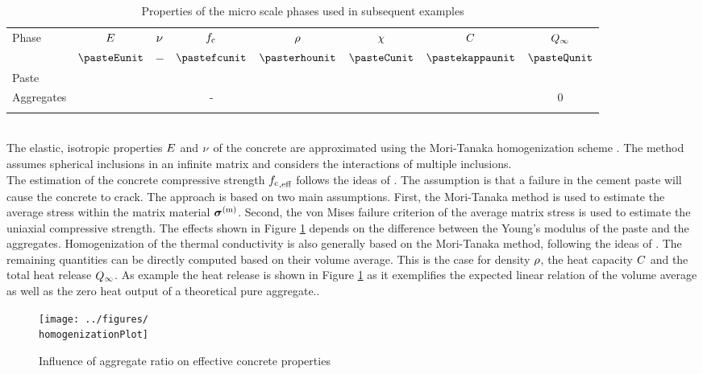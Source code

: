 \begin{table}[ht]
	\begin{center}
		\begin{minipage}{.9\textwidth}
			\caption{Properties of the micro scale phases used in subsequent examples}\label{tab:homogenizationproperties}
			\begin{tabular}{lccccccc}
				\toprule
				Phase & $E$ & $\nu$ & $f_{\text{c}}$ & $\rho$ & $\chi$ & $C$ & $Q_{\infty}$\\
				  & $\pasteEunit$  & $-$  & $\pastefcunit$  & $\pasterhounit$  & $\pasteCunit$  & $\pastekappaunit$  &  $\pasteQunit$ \\
				\midrule
			Paste	& \pasteE & \pastenu & \pastefc & \pasterho & \pasteC & \pastekappa &  \pasteQ \\
			Aggregates	& \aggregatesE & \aggregatesnu & - & \aggregatesrho & \aggregatesC & \aggregateskappa &  0 \\
				\botrule
			\end{tabular}
		\end{minipage}
	\end{center}
		
\end{table}
\\
The elastic, isotropic properties $E$ and $\nu$ of the concrete are approximated using the Mori-Tanaka homogenization scheme \cite{mor_1973_asi}.
The method assumes spherical inclusions in an infinite matrix and considers the interactions of multiple inclusions.\\
The estimation of the concrete compressive strength ${f_{\text{c}}}_{,\text{eff}}$ follows the ideas of \cite{nev_2018_mcam}.
The assumption is that a failure in the cement paste will cause the concrete to crack.
The approach is based on two main assumptions.
First, the Mori-Tanaka method is used to estimate the average stress within the matrix material $\boldsymbol{\sigma}^{(\text{m})}$. 
Second, the von Mises failure criterion of the average matrix stress is used to estimate the uniaxial compressive strength.
The effects shown in Figure \ref{fig:homogenization} depends on the difference between the Young's modulus of the paste and the aggregates.
Homogenization of the thermal conductivity is also generally based on the Mori-Tanaka method, following the ideas of \cite{str_2011_mbeo}.
The remaining quantities can be directly computed based on their volume average.
This is the case for density $\rho$, the heat capacity $C$ and the total heat release $Q_{\infty}$.
As example the heat release is shown in Figure \ref{fig:homogenization} as it exemplifies the expected linear relation of the volume average as well as the zero heat output of a theoretical pure aggregate..
\begin{figure}[ht]%
	\centering
	\texttt{[image: ../figures/\\homogenizationPlot]}
	\caption{Influence of aggregate ratio on effective concrete properties}\label{fig:homogenization}
\end{figure}
